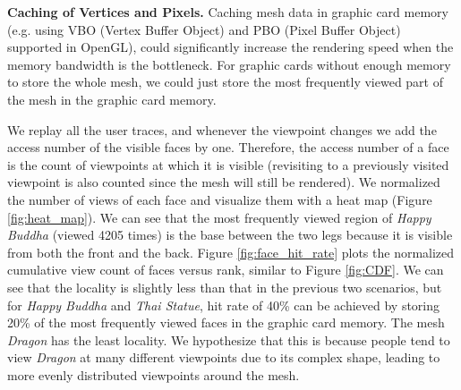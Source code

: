 \textbf{Caching of Vertices and Pixels.}
Caching mesh data in graphic card memory 
(e.g. using VBO (Vertex Buffer Object) and PBO (Pixel Buffer Object) supported in OpenGL), 
could significantly increase the rendering speed when the memory bandwidth is the bottleneck.
For graphic cards without enough memory to store the whole mesh, we could just store the most frequently viewed part of the mesh
in the graphic card memory. 

We replay all the user traces, and whenever the viewpoint changes 
we add the access number of the visible faces by one. 
Therefore, the access number of a face is the count of viewpoints at 
which it is visible (revisiting to a previously visited viewpoint is also counted
since the mesh will still be rendered). 
We normalized the number of views of each face and visualize them with
 a heat map (Figure \ref{fig:heat_map}). 
We can see that the most frequently viewed region of \textit{Happy Buddha} (viewed 4205 times) is 
the base between the two legs because it is visible from both the front and the back.
Figure \ref{fig:face_hit_rate} plots the normalized cumulative view count of faces versus rank, 
similar to Figure \ref{fig:CDF}. We can see that the locality is slightly less than
that in the previous two scenarios, but for \textit{Happy Buddha} and \textit{Thai Statue}, hit rate of 40\%  can be achieved
by storing 20\% of the most frequently viewed faces in the graphic card memory.
The mesh \textit{Dragon} has the least locality. We hypothesize that this is because %
people tend to view \textit{Dragon} at many different viewpoints due to its complex shape,
leading to more evenly distributed viewpoints around the mesh.
